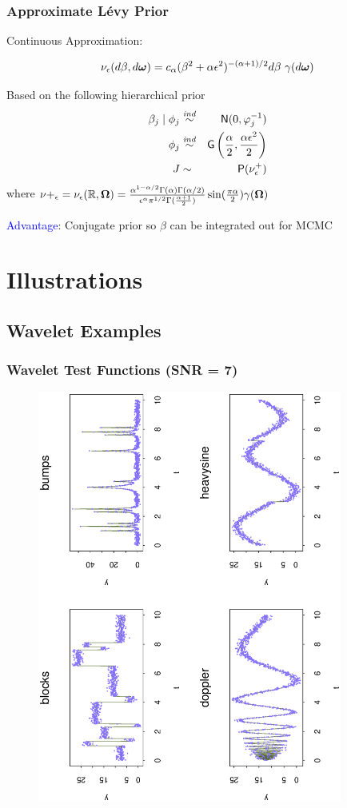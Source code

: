 \documentclass[dvips]{beamer}
\newcommand{\bs}[2]{\begin{frame} \frametitle{#1} 
{#2}
\end{frame} }
\newcommand{\blue}{\textcolor{Blue}}
\begin{document}
\bs{Approximate L\'evy Prior} {
Continuous Approximation: 

$$\nu_\epsilon(d\beta, d \bm \omega) = c_\alpha (\beta^2 + \alpha
\epsilon^2)^{-(\alpha + 1)/2} d\beta \ \gamma(d \bm \omega) $$

Based on the following hierarchical prior
\begin{eqnarray*}
  \beta_j \mid \phi_j & \mathrel{\mathop{\sim}\limits^{\mathit{ind}}} & \textsf{N}(0,  \varphi_j^{-1}) \\
  \phi_j    & \mathrel{\mathop{\sim}\limits^{\mathit{ind}}} & \mbox{\sf G}\left(\frac{\alpha}{2}, \frac{\alpha \epsilon^2}{2}\right) \\
   J & \sim & \mbox{\sf P}(\nu^+_\epsilon)
\end{eqnarray*}
where $\nu+_\epsilon = \nu_\epsilon(\mathbb{R}, \bm \Omega) = \frac{\alpha ^{1
    - \alpha/2} \Gamma(\alpha)\Gamma(\alpha/2)}{\epsilon^\alpha
  \pi^{1/2} \Gamma(\frac{\alpha +1}{2})} \sin(\frac{\pi \alpha} {2}) \gamma(\bm \Omega)$

\blue{Advantage}: Conjugate prior so $\beta$ can be integrated out for MCMC
}


\section{Illustrations}
\subsection{Wavelet Examples}

\bs{Wavelet Test Functions (SNR = 7)} {
\begin{figure}[!h]
  \begin{center}
    \includegraphics[angle=270,origin=l,totalheight=6truecm,
     clip=1,width=10cm]{wavedata.ps}
  \end{center}
\end{figure}
}
\end{document}
